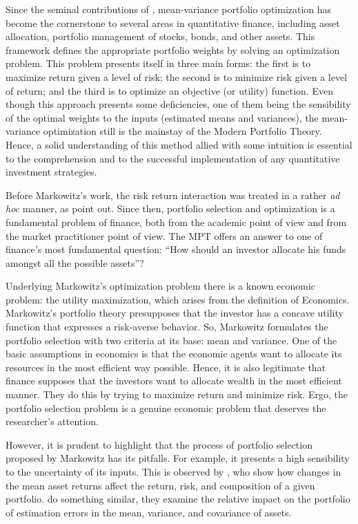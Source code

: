 \documentclass[12pt,oneside,a4paper]{memoir}
\begin{document}
Since the seminal contributions of , mean-variance portfolio optimization has become the cornerstone to several areas in quantitative finance, including asset allocation, portfolio management of stocks, bonds, and other assets.
This framework defines the appropriate portfolio weights by solving an optimization problem.
This problem presents itself in three main forms:
the first is to maximize return given a level of risk;
the second is to minimize risk given a level of return; and
the third is to optimize an objective (or utility) function.
Even though this approach presents some deficiencies, one of them being the sensibility of the optimal weights to the inputs (estimated means and variances), the mean-variance optimization still is the mainstay of the Modern Portfolio Theory.
Hence, a solid understanding of this method allied with some intuition is essential to the comprehension and to the successful implementation of any quantitative investment strategies.

Before Markowitz's work, the risk return interaction was treated in a rather \textit{ad hoc} manner, as  point out.
Since then, portfolio selection and optimization is a fundamental problem of finance, both from the academic point of view and from the market practitioner point of view.
The MPT offers an answer to one of finance's most fundamental question: ``How should an investor allocate his funds amongst all the possible assets''?

Underlying Markowitz's optimization problem there is a known economic problem: the utility maximization, which arises from the definition of Economics. 
Markowitz's portfolio theory presupposes that the investor has a concave utility function that expresses a risk-averse behavior.
So, Markowitz formulates the portfolio selection with two criteria at its base: mean and variance.
One of the basic assumptions in economics is that the economic agents want to allocate its resources in the most efficient way possible.
Hence, it is also legitimate that finance supposes that the investors want to allocate wealth in the most efficient manner.
They do this by trying to maximize return and minimize risk.
Ergo, the portfolio selection problem is a genuine economic problem that deserves the researcher's attention.

However, it is prudent to highlight that the process of portfolio selection proposed by Markowitz has its pitfalls.
For example, it presents a high sensibility to the uncertainty of its inputs.
This is observed by , who show how changes in the mean asset returns affect the return, risk, and composition of a given portfolio.
 do something similar, they examine the relative impact on the portfolio of estimation errors in the mean, variance, and covariance of assets.
\end{document}
